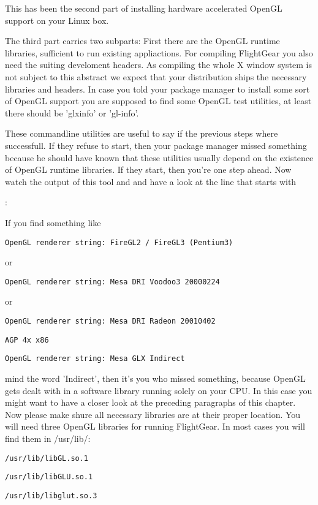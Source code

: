 This has been the second part of installing hardware accelerated OpenGL
support on your Linux box.

The third part carries two subparts: First there are the OpenGL runtime
libraries, sufficient to run existing appliactions. For compiling FlightGear
you also need the suiting develoment headers.
As compiling the whole X window system is not subject to this abstract we
expect that your distribution ships the necessary libraries and headers. In
case you told your package manager to install some sort of OpenGL support
you are supposed to find some OpenGL test utilities, at least there should
be 'glxinfo' or 'gl-info'.

These commandline utilities are useful to say if the previous steps where
successfull. If they refuse to start, then your package manager missed
something because he should have known that these utilities usually depend
on the existence of OpenGL runtime libraries. If they start, then you're one
step ahead. Now watch the output of this tool and and have a look at the
line that starts with

:

If you find something like
\medskip

  \texttt{OpenGL renderer string: FireGL2 / FireGL3 (Pentium3)}
  \medskip

\noindent
or
\medskip

  \texttt{OpenGL renderer string: Mesa DRI Voodoo3 20000224}
  \medskip

\noindent
or
\medskip

  \texttt{OpenGL renderer string: Mesa DRI Radeon 20010402}
    
  \texttt{AGP 4x x86}
  \medskip

  \texttt{OpenGL renderer string: Mesa GLX Indirect}
  \medskip

\noindent
mind the word 'Indirect', then it's you who missed something, because OpenGL
gets dealt with in a software library running solely on your CPU. In this
case you might want to have a closer look at the preceding paragraphs of
this chapter. Now please make shure all necessary libraries are at their
proper location.
You will need three OpenGL libraries for running FlightGear. In most cases
you will find them in /usr/lib/:

\texttt{/usr/lib/libGL.so.1}

\texttt{/usr/lib/libGLU.so.1}

\texttt{/usr/lib/libglut.so.3}

